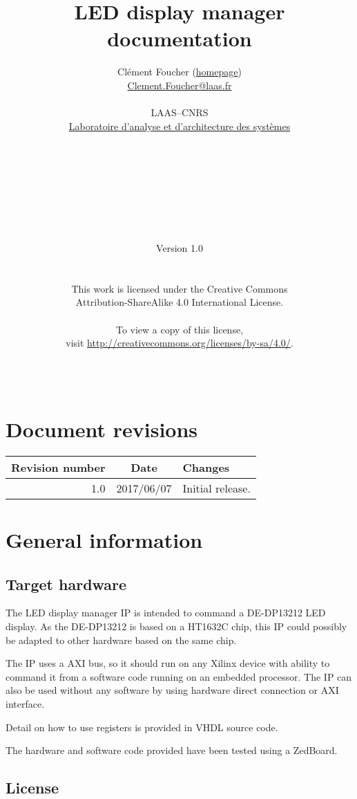\documentclass[openany,a4paper]{book}
\title{LED display manager documentation}
\author
{
        Clément Foucher (\href{https://homepages.laas.fr/cfoucher}{homepage})\\
	\href{mailto:Clement.Foucher@laas.fr}{Clement.Foucher@laas.fr}\\
	\\
	LAAS--CNRS\\
	\href{https://www.laas.fr/public/en}{Laboratoire d'analyse et d'architecture des syst\`emes}\\
	\\
	\\
	\\
        \\
        \\
	\\
	\\
	\\
	Version 1.0\\
	\\
	\\
	This work is licensed under the Creative Commons\\
	Attribution-ShareAlike 4.0 International License.\\
	\\
	To view a copy of this license,\\
	visit \href{http://creativecommons.org/licenses/by-sa/4.0/}{http://creativecommons.org/licenses/by-sa/4.0/}.
	\\
	\\
	\\
}
\begin{document}
\maketitle

\tableofcontents


\newpage

\chapter*{Document revisions}

\begin{center}

\begin{tabular}{ r | c || l }
   Revision number & Date       & Changes \\ \hline \hline
   1.0             & 2017/06/07 & Initial release. \\ \hline

\end{tabular}


\end{center}



\chapter{General information}

\section{Target hardware}

The LED display manager IP is intended to command a DE-DP13212 LED display.
As the DE-DP13212 is based on a HT1632C chip, this IP could possibly be adapted to other hardware based on the same chip.

The IP uses a AXI bus, so it should run on any Xilinx device with ability to command it from a software code running on an embedded processor.
The IP can also be used without any software by using hardware direct connection or AXI interface.

Detail on how to use registers is provided in VHDL source code.

The hardware and software code provided have been tested using a ZedBoard.

\section{License}
\end{document}
